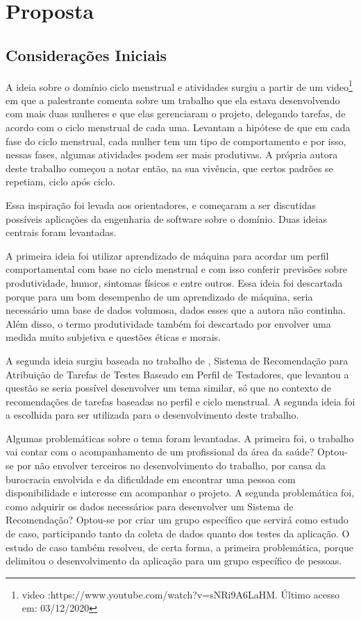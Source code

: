 \chapter[Proposta]{Proposta}
\label{ch:proposta}
\section{Considerações Iniciais }

A ideia sobre o domínio ciclo menstrual e atividades surgiu a 
partir de um video\footnote{video :https://www.youtube.com/watch?v=sNRi9A6LaHM. Último acesso em: 03/12/2020} em que a palestrante comenta sobre um 
trabalho que ela estava desenvolvendo com mais duas  
mulheres e que elas gerenciaram o projeto, delegando tarefas, de 
acordo com o ciclo menstrual de cada uma. Levantam a hipótese de 
que em cada fase do ciclo menstrual, cada mulher tem um tipo 
de comportamento e por isso, nessas fases, algumas atividades 
podem ser mais produtivas.
A própria autora deste trabalho começou a notar então, na sua 
vivência, que certos padrões se repetiam, ciclo após ciclo.

Essa inspiração foi levada aos 
orientadores, e começaram a ser discutidas possíveis aplicações da 
engenharia de software sobre o domínio. Duas ideias centrais 
foram levantadas. 

A primeira ideia foi utilizar aprendizado de máquina para 
acordar um perfil comportamental com base no ciclo menstrual e 
com isso conferir previsões sobre produtividade, humor, sintomas 
físicos e entre outros. Essa ideia foi descartada porque para 
um bom desempenho de um aprendizado de máquina, seria necessário 
uma base de dados volumosa, dados esses que 
a autora não continha. Além disso, o termo produtividade também 
foi descartado por envolver uma medida muito subjetiva e questões éticas e morais. 

A segunda ideia surgiu baseada no trabalho de , Sistema de Recomendação para Atribuição de Tarefas de Testes 
Baseado em Perfil de Testadores, que levantou a questão se seria 
possível desenvolver um tema similar, só que no
contexto de recomendações de tarefas baseadas no perfil e 
ciclo menstrual. A segunda ideia foi a escolhida para ser 
utilizada para o desenvolvimento deste trabalho.

Algumas problemáticas sobre o tema foram levantadas. A primeira 
foi, o trabalho vai contar com o acompanhamento de um 
profissional da área da saúde? Optou-se por não envolver 
terceiros no desenvolvimento do trabalho, por causa da 
burocracia envolvida e da dificuldade 
em encontrar uma pessoa com disponibilidade e interesse em 
acompanhar o projeto. A segunda problemática foi, 
como adquirir os dados necessários para desenvolver um 
Sistema de Recomendação? Optou-se por criar um grupo 
específico que servirá como estudo de caso, participando tanto 
da coleta de dados quanto dos testes da aplicação. O estudo de 
caso também resolveu, de certa forma, a primeira problemática, 
porque delimitou o desenvolvimento da aplicação para um grupo 
específico de pessoas. 



